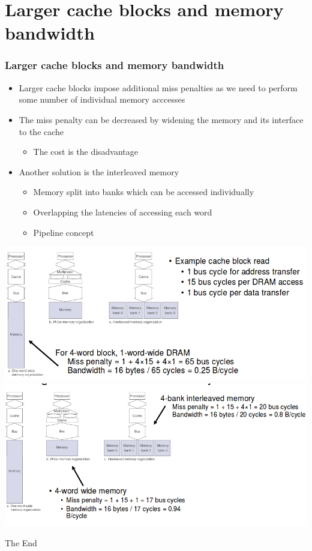 \documentclass{beamer}
\begin{document}
\section{Larger cache blocks and memory bandwidth}
\begin{frame}[allowframebreaks]
\frametitle{Larger cache blocks and memory bandwidth}
\begin{itemize}
\item Larger cache blocks impose additional miss penalties as we need to perform some number of individual memory acccesses
\item The miss penalty can be decreased by {\color{green}widening the memory} and its interface to the cache
\begin{itemize}
\item The cost is the disadvantage
\end{itemize}
\item Another solution is the {\color{red}interleaved} memory
\begin{itemize}
\item Memory split into banks which can be accessed individually
\item Overlapping the latencies of accessing each word
\item Pipeline concept
\end{itemize}
\end{itemize}
\includegraphics[scale=0.4]{lacache1.png}\\
\includegraphics[scale=0.4]{lacache2.png}
\end{frame}

\begin{frame} 
\Huge{\centerline{The End}}
\end{frame}
\end{document}
